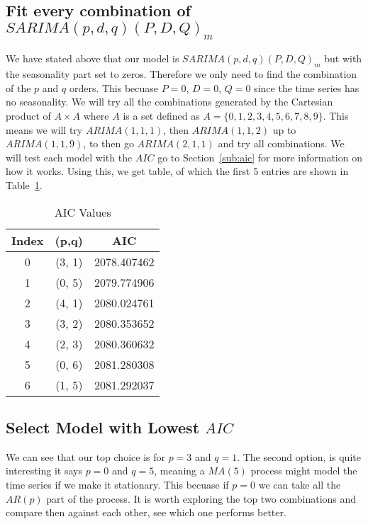 \documentclass[journal]{IEEEtran}
\begin{document}
\subsection{Fit every combination of $SARIMA(p,d,q)(P,D,Q)_m$}

We have stated above that our model is $SARIMA(p,d,q)(P,D,Q)_m$ but with the
seasonality part set to zeros. Therefore we only need to find the combination
of the $p$ and $q$ orders. This becuase $P=0$, $D=0$, $Q=0$ since the time
series has no seasonality. We will try all the combinations generated by the
Cartesian product of $A\times A$ where $A$ is a set defined as $A =
\{0,1,2,3,4,5,6,7,8,9\}$. This means we will try $ARIMA(1,1,1)$, then
$ARIMA(1,1,2)$ up to $ARIMA(1,1,9)$, to then go $ARIMA(2,1,1)$ and try all
combinations. We will test each model with the $AIC$ go to
Section~\ref{sub:aic} for more information on how it works. Using this, we get
table, of which the first 5 entries are shown in Table~\ref{tab:aic}.

\begin{table}[htbp]
  \centering
  \caption{AIC Values}
  \label{tab:aic}
  \begin{tabular}{|c|c|c|}
    \hline
    Index & (p,q) & AIC \\
    \hline
    0 & (3, 1) & 2078.407462 \\
    1 & (0, 5) & 2079.774906 \\
    2 & (4, 1) & 2080.024761 \\
    3 & (3, 2) & 2080.353652 \\
    4 & (2, 3) & 2080.360632 \\
    5 & (0, 6) & 2081.280308 \\
    6 & (1, 5) & 2081.292037 \\
    \hline
  \end{tabular}
\end{table}

\subsection{Select Model with Lowest $AIC$}

We can see that our top choice is for $p=3$ and $q=1$. The second option, is
quite interesting it says $p=0$ and $q=5$, meaning a $MA(5)$ process might
model the time series if we make it stationary. This becuase if $p=0$ we can
take all the $AR(p)$ part of the process. It is worth exploring the top two
combinations and compare then against each other, see which one performs
better.
\end{document}
